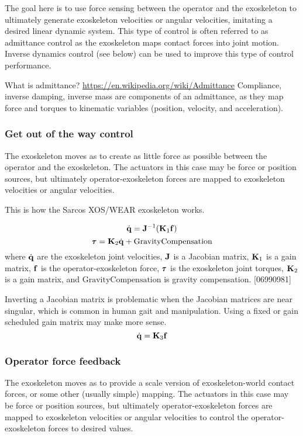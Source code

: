 \documentclass[letterpaper,12pt,fullpage]{article}
\newcommand{\gc}{{\mbox {GravityCompensation}}}
\begin{document}
The goal here is to use force sensing between the operator and the
exoskeleton to ultimately generate exoskeleton velocities or angular velocities,
imitating a desired linear dynamic system.
This type of control is often referred to as admittance control as the
exoskeleton maps contact forces into joint motion.
Inverse dynamics control (see below)
can be used to improve this type of control performance.

What is admittance?
\url{https://en.wikipedia.org/wiki/Admittance}
Compliance, inverse damping, inverse mass are components of an admittance,
as they map force and torques to kinematic variables (position, velocity, and
acceleration). 

\subsubsection{Get out of the way control}

The exoskeleton moves as to create as little force as possible between the
operator and the exoskeleton. The actuators in this case may be force or
position sources, but ultimately operator-exoskeleton forces are mapped
to exoskeleton velocities or angular velocities.

This is how the Sarcos XOS/WEAR exoskeleton works.

\begin{equation}
\dot{{\bf q}} = {\bf J}^{-1} ({\bf K}_1 {\bf f})
\end{equation}
\begin{equation}
\vtau = \mK_2 \dot{\vq} + \gc
\end{equation}
where $\dot{{\bf q}}$ are the exoskeleton joint velocities,
${\bf J}$ is a Jacobian matrix, ${\bf K}_1$ is a gain matrix,
${\bf f}$ is the operator-exoskeleton force, 
$\vtau$ is the exoskeleton joint torques, ${\bf K}_2$ is a gain matrix,
and $\gc$ is gravity compensation.
[06990981]

Inverting a Jacobian matrix is problematic when the Jacobian matrices are
near singular, which is common in human gait and manipulation.
Using a fixed or gain scheduled gain matrix may make more sense.
\begin{equation}
\dot{{\bf q}} = {\bf K}_3 {\bf f}
\end{equation}

\subsubsection{Operator force feedback}

The exoskeleton moves as to provide a scale version of exoskeleton-world
contact forces, or some other (usually simple) mapping. 
The actuators in this case may be force or
position sources, but ultimately operator-exoskeleton forces are mapped
to exoskeleton velocities or angular velocities to control the
operator-exoskeleton forces to desired values.
\end{document}

